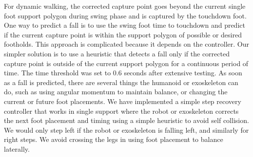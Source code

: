 \documentclass[letterpaper,12pt,fullpage]{article}
\begin{document}
For dynamic walking, the corrected capture point goes beyond the
current single foot support polygon during swing phase and is captured by
the touchdown foot. One way to predict a fall is to use the
swing foot time to touchdown and predict if the current
capture point is within the support polygon of possible or desired
footholds. This approach is complicated because it depends
on the controller. Our simpler solution is to use a heuristic
that detects a fall only if the corrected capture point
is outside of the current support
polygon for a continuous period of time. The time threshold was set to
0.6 seconds after extensive testing. As soon as a fall is
predicted, there are several things the humanoid or exoskeleton can do, such
as using angular momentum to maintain balance, or changing the
current or future foot placements.
We have implemented a simple
step recovery controller that works in single support where
the robot or exoskeleton corrects the next foot placement and timing
using a simple heuristic to avoid self collision.
We would only step left if the robot or exoskeleton is falling left, and similarly
for right steps. We avoid crossing the legs in using foot placement
to balance laterally.
\end{document}
